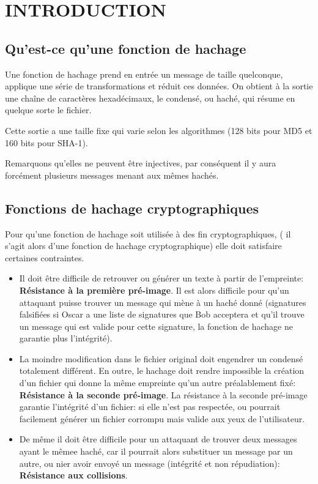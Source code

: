\documentclass[10.5pt, a4paper, twoside, openright]{report}
\begin{document}
\chapter{INTRODUCTION}
\section{Qu’est-ce qu’une fonction de hachage}
Une fonction de hachage prend en entrée un message de taille quelconque, applique une série de transformations et réduit ces données. On obtient à la sortie une chaîne de caractères hexadécimaux, le condensé, ou haché, qui résume en quelque sorte le fichier. 

Cette sortie a une taille fixe qui varie selon les algorithmes (128 bits pour MD5 et 160 bits pour SHA-1). 

Remarquons qu’elles ne peuvent être injectives, par conséquent il y aura forcément plusieurs messages menant aux mêmes hachés.

\section{Fonctions de hachage cryptographiques} 
Pour qu’une fonction de hachage soit utilisée à des fin cryptographiques, ( il s’agit alors d’une fonction de hachage cryptographique) elle doit satisfaire certaines contraintes.
\begin{itemize}
\item{Il doit être difficile de retrouver ou générer un texte à partir de l’empreinte: \textbf{Résistance à la première pré-image}.
Il est alors difficile pour qu’un attaquant puisse trouver un message qui mène à un haché donné 	(signatures falsifiées si Oscar a une liste de signatures que Bob acceptera et qu’il trouve un message qui est valide pour cette signature, la fonction de hachage ne garantie plus l’intégrité).}
\item{La moindre modification dans le fichier original doit engendrer un condensé totalement différent. En outre, le hachage doit rendre impossible la création d’un fichier qui donne la même empreinte qu’un autre préalablement fixé: \textbf{Résistance à la seconde pré-image}. 
La résistance à la seconde pré-image garantie l’intégrité d’un fichier: si elle n’est pas respectée, ou pourrait facilement générer un fichier corrompu mais valide aux yeux de l’utilisateur.}
\item{De même il doit être difficile pour un attaquant de trouver deux messages ayant le mêmee haché, car il pourrait alors substituer un message par un autre, ou nier avoir envoyé un message (intégrité et non répudiation): \textbf{Résistance aux collisions}.}
\end{itemize}
\end{document}
